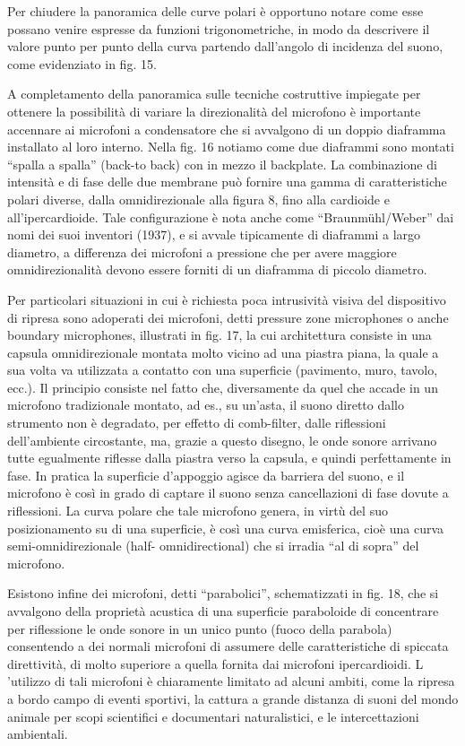 Per chiudere la panoramica delle curve polari è opportuno notare come esse possano venire espresse da funzioni trigonometriche, in modo da descrivere il valore punto per punto della curva partendo dall’angolo di incidenza del suono, come evidenziato in fig. 15.

A completamento della panoramica sulle tecniche costruttive impiegate per ottenere la possibilità di variare la direzionalità del microfono è importante accennare ai microfoni a condensatore che si avvalgono di un doppio diaframma installato al loro interno. Nella fig. 16 notiamo come due diaframmi sono montati “spalla a spalla” (back-to back) con in mezzo il backplate. La combinazione di intensità e di fase delle due membrane può fornire una gamma di caratteristiche polari diverse, dalla omnidirezionale alla figura 8, fino alla cardioide e all’ipercardioide. Tale configurazione è nota anche come “Braunmühl/Weber” dai nomi dei suoi inventori (1937), e si avvale tipicamente di diaframmi a largo diametro, a differenza dei microfoni a pressione che per avere
maggiore omnidirezionalità devono essere forniti di un diaframma di piccolo diametro.

Per particolari situazioni in cui è richiesta poca intrusività visiva del dispositivo di ripresa sono adoperati dei microfoni, detti pressure zone microphones o anche boundary microphones, illustrati in fig. 17, la cui architettura consiste in una capsula omnidirezionale montata molto vicino ad una piastra piana, la quale a sua volta va utilizzata a
contatto con una superficie (pavimento, muro, tavolo, ecc.). Il principio consiste nel fatto che, diversamente da quel che accade in un microfono tradizionale montato, ad es., su un’asta, il suono diretto dallo strumento non è degradato, per effetto di comb-filter, dalle riflessioni dell’ambiente circostante, ma, grazie a questo disegno, le onde sonore arrivano tutte egualmente riflesse dalla piastra verso la capsula, e quindi perfettamente in fase. In pratica la superficie d’appoggio agisce da barriera del suono, e il microfono è così in grado di captare il suono senza cancellazioni di fase dovute a riflessioni. La curva polare che tale microfono genera, in virtù del suo posizionamento su di una superficie, è così una curva emisferica, cioè una curva semi-omnidirezionale (half- omnidirectional) che si irradia “al di sopra” del microfono.


Esistono infine dei microfoni, detti “parabolici”, schematizzati in fig. 18, che si avvalgono della proprietà acustica di una superficie paraboloide di concentrare per riflessione le onde sonore in un unico punto (fuoco della parabola) consentendo a dei normali microfoni di assumere delle caratteristiche di spiccata direttività, di molto superiore a quella fornita dai microfoni ipercardioidi. L ’utilizzo di tali microfoni è chiaramente limitato ad alcuni ambiti, come la ripresa a bordo campo di eventi sportivi, la cattura a grande distanza di suoni del mondo animale per scopi scientifici e documentari naturalistici, e le intercettazioni ambientali.

